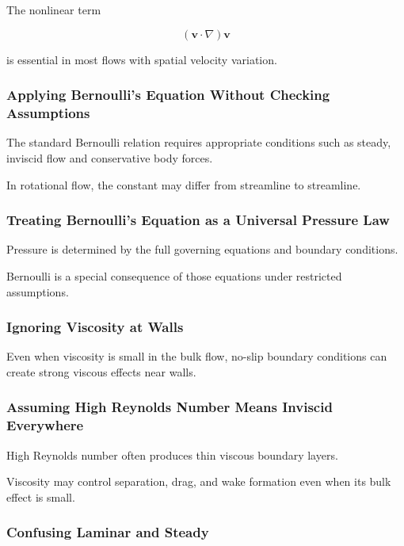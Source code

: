 The nonlinear term

\[
(\mathbf{v}\cdot\nabla)\mathbf{v}
\]

is essential in most flows with spatial velocity variation.

\subsubsection{Applying Bernoulli's Equation Without Checking Assumptions}

The standard Bernoulli relation requires appropriate conditions such as
steady, inviscid flow and conservative body forces.

In rotational flow, the constant may differ from streamline to streamline.

\subsubsection{Treating Bernoulli's Equation as a Universal Pressure Law}

Pressure is determined by the full governing equations and boundary
conditions.

Bernoulli is a special consequence of those equations under restricted
assumptions.

\subsubsection{Ignoring Viscosity at Walls}

Even when viscosity is small in the bulk flow, no-slip boundary conditions
can create strong viscous effects near walls.

\subsubsection{Assuming High Reynolds Number Means Inviscid Everywhere}

High Reynolds number often produces thin viscous boundary layers.

Viscosity may control separation, drag, and wake formation even when its bulk
effect is small.

\subsubsection{Confusing Laminar and Steady}

